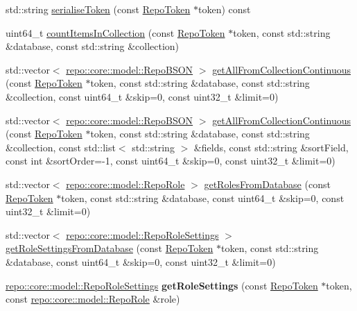 \begin{DoxyCompactItemize}
\item 
std\+::string \hyperlink{classrepo_1_1_repo_controller_a42fdb7abe1b881001c1d37b8edd234ba}{serialise\+Token} (const \hyperlink{class_repo_controller_1_1_repo_token}{Repo\+Token} $\ast$token) const 
\item 
uint64\+\_\+t \hyperlink{classrepo_1_1_repo_controller_a45095c3036bd603d62672cf1fcd197ee}{count\+Items\+In\+Collection} (const \hyperlink{class_repo_controller_1_1_repo_token}{Repo\+Token} $\ast$token, const std\+::string \&database, const std\+::string \&collection)
\item 
std\+::vector$<$ \hyperlink{classrepo_1_1core_1_1model_1_1_repo_b_s_o_n}{repo\+::core\+::model\+::\+Repo\+B\+S\+O\+N} $>$ \hyperlink{classrepo_1_1_repo_controller_a6d640c76549241515957adaa37610558}{get\+All\+From\+Collection\+Continuous} (const \hyperlink{class_repo_controller_1_1_repo_token}{Repo\+Token} $\ast$token, const std\+::string \&database, const std\+::string \&collection, const uint64\+\_\+t \&skip=0, const uint32\+\_\+t \&limit=0)
\item 
std\+::vector$<$ \hyperlink{classrepo_1_1core_1_1model_1_1_repo_b_s_o_n}{repo\+::core\+::model\+::\+Repo\+B\+S\+O\+N} $>$ \hyperlink{classrepo_1_1_repo_controller_ad0dcce688f2bb62dd318136539146b95}{get\+All\+From\+Collection\+Continuous} (const \hyperlink{class_repo_controller_1_1_repo_token}{Repo\+Token} $\ast$token, const std\+::string \&database, const std\+::string \&collection, const std\+::list$<$ std\+::string $>$ \&fields, const std\+::string \&sort\+Field, const int \&sort\+Order=-\/1, const uint64\+\_\+t \&skip=0, const uint32\+\_\+t \&limit=0)
\item 
std\+::vector$<$ \hyperlink{classrepo_1_1core_1_1model_1_1_repo_role}{repo\+::core\+::model\+::\+Repo\+Role} $>$ \hyperlink{classrepo_1_1_repo_controller_a7c52604cb77ef19280fc61bc54c9feea}{get\+Roles\+From\+Database} (const \hyperlink{class_repo_controller_1_1_repo_token}{Repo\+Token} $\ast$token, const std\+::string \&database, const uint64\+\_\+t \&skip=0, const uint32\+\_\+t \&limit=0)
\item 
std\+::vector$<$ \hyperlink{classrepo_1_1core_1_1model_1_1_repo_role_settings}{repo\+::core\+::model\+::\+Repo\+Role\+Settings} $>$ \hyperlink{classrepo_1_1_repo_controller_ab4556a1c9278bb4499613895a3d554c5}{get\+Role\+Settings\+From\+Database} (const \hyperlink{class_repo_controller_1_1_repo_token}{Repo\+Token} $\ast$token, const std\+::string \&database, const uint64\+\_\+t \&skip=0, const uint32\+\_\+t \&limit=0)
\item 
\hypertarget{classrepo_1_1_repo_controller_ac6cb976824cc1b75615409d2c1089bbf}{}\hyperlink{classrepo_1_1core_1_1model_1_1_repo_role_settings}{repo\+::core\+::model\+::\+Repo\+Role\+Settings} {\bfseries get\+Role\+Settings} (const \hyperlink{class_repo_controller_1_1_repo_token}{Repo\+Token} $\ast$token, const \hyperlink{classrepo_1_1core_1_1model_1_1_repo_role}{repo\+::core\+::model\+::\+Repo\+Role} \&role)\label{classrepo_1_1_repo_controller_ac6cb976824cc1b75615409d2c1089bbf}


\end{DoxyCompactItemize}
